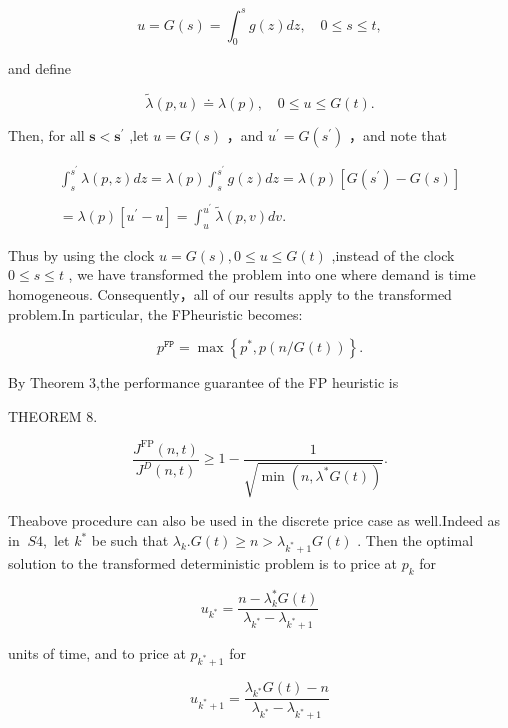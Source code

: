 \[
u = G ( s ) = \int _ { 0 } ^ { s } g ( z ) d z , \quad 0 \leq s \leq t ,
\]

and define

\[
\tilde { \lambda } ( p , u ) \doteq \lambda ( p ) , \quad 0 \le u \le G ( t ) .
\]

Then, for all \(\boldsymbol { s } < \boldsymbol { s } ^ { \prime }\)
,let \(u = G ( s )\) ，and \(u ^ { \prime } = G ( s ^ { \prime } )\)
，and note that

\[
\begin{array} { c } { { { \displaystyle { \int _ { s } ^ { s ^ { \prime } } \lambda ( p , z ) d z = \lambda ( p ) \int _ { s } ^ { s ^ { \prime } } g ( z ) d z = \lambda ( p ) [ G ( s ^ { \prime } ) - G ( s ) ] } } } } \\ { { { { } } } } \\ { { { = \lambda ( p ) [ u ^ { \prime } - u ] = \displaystyle { \int _ { u } ^ { u ^ { \prime } } { } ^ { } { \tilde { \lambda } ( p , v ) d v } } . } } } \end{array}
\]

Thus by using the clock \(u = G ( s ) , 0 \leq u \leq G ( t )\) ,instead
of the clock \(0 \leq s \leq t\) , we have transformed the problem into
one where demand is time homogeneous. Consequently，all of our results
apply to the transformed problem.In particular, the FPheuristic becomes:

\[
p ^ { \mathtt { F P } } = \operatorname* { m a x } \left\{ p ^ { * } , p ( n / G ( t ) ) \right\} .
\]

By Theorem 3,the performance guarantee of the FP heuristic is

THEOREM 8.

\[
\frac { J ^ { \mathrm { F P } } ( n , t ) } { J ^ { D } ( n , t ) } \geq 1 - \frac { 1 } { \sqrt { \operatorname* { m i n } ( n , \lambda ^ { * } G ( t ) ) } } .
\]

Theabove procedure can also be used in the discrete price case as
well.Indeed as in \(\ S 4 ,\) let \(k ^ { * }\) be such that
\(\lambda _ { k } . G ( t ) \geq n > \lambda _ { k ^ { * } + 1 } G ( t )\)
. Then the optimal solution to the transformed deterministic problem is
to price at \(p _ { k }\) for

\[
u _ { k ^ { * } } = \frac { n - \lambda _ { k } ^ { * } G ( t ) } { \lambda _ { k ^ { * } } - \lambda _ { k ^ { * } + 1 } }
\]

units of time, and to price at \(p _ { k ^ { * } + 1 }\) for

\[
u _ { k ^ { * } + 1 } = { \frac { \lambda _ { k ^ { * } } G ( t ) - n } { \lambda _ { k ^ { * } } - \lambda _ { k ^ { * } + 1 } } }
\]

